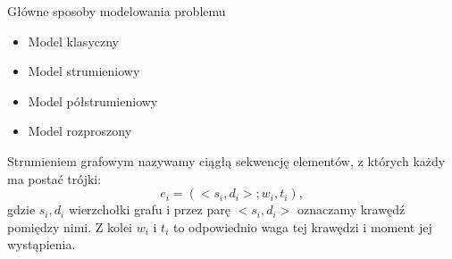 \begin{frame}[squeeze]{Główne sposoby modelowania problemu}
    \begin{itemize}
        \setlength\itemsep{0.6em}
        \item Model klasyczny
        \item Model strumieniowy 
        \item Model półstrumieniowy
        \item Model rozproszony
    \end{itemize}

    \begin{definicja}
        Strumieniem grafowym nazywamy ciągłą sekwencję elementów, z których każdy ma postać trójki: 
        \[
            e_i = (<s_i, d_i>; w_i, t_i),
        \]
        gdzie $s_i, d_i$ wierzchołki grafu i przez parę $<s_i, d_i>$ oznaczamy krawędź pomiędzy nimi. Z kolei $w_i$ i $t_i$ to odpowiednio waga tej krawędzi i moment jej wystąpienia.
    \end{definicja}
\end{frame}
